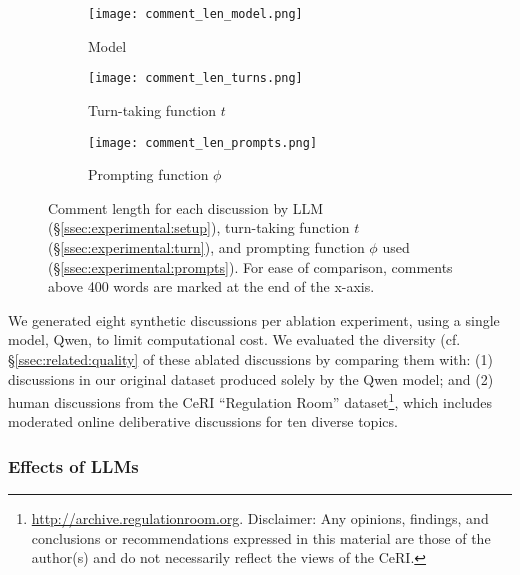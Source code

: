 \begin{figure*}[t]
    \begin{subfigure}{0.32\linewidth}
        \texttt{[image: comment\_len\_model.png]}
        \caption{Model}
        \label{fig:comment_length_model}
    \end{subfigure}%
    \hfill
    \begin{subfigure}{0.32\linewidth}
        \texttt{[image: comment\_len\_turns.png]}
        \caption{Turn-taking function $t$}
        \label{fig:comment_length_turns}
    \end{subfigure}%
    \hfill
    \begin{subfigure}{0.32\linewidth}
        \texttt{[image: comment\_len\_prompts.png]}
        \caption{Prompting function $\phi$}
        \label{fig:comment_length_prompts}
    \end{subfigure}%

    \caption{Comment length for each discussion by \ac{LLM} (\S\ref{ssec:experimental:setup}), turn-taking function $t$ (\S\ref{ssec:experimental:turn}), and prompting function $\phi$ used (\S\ref{ssec:experimental:prompts}). For ease of comparison, comments above 400 words are marked at the end of the x-axis.}
    \label{fig:comment_length}
\end{figure*}


We generated eight synthetic discussions per ablation experiment, using a single model, Qwen, to limit computational cost. We evaluated the diversity (cf. \S\ref{ssec:related:quality} of these ablated discussions by comparing them with: (1) discussions in our original dataset produced solely by the Qwen model; and (2) human discussions from the \ac{CeRI} “Regulation Room” dataset\footnote{\url{http://archive.regulationroom.org}. Disclaimer: Any opinions, findings, and conclusions or recommendations expressed in this material are those of the author(s) and do not necessarily reflect the views of the \ac{CeRI}.}, which includes moderated online deliberative discussions for ten diverse topics.


\subsubsection{Effects of LLMs}

